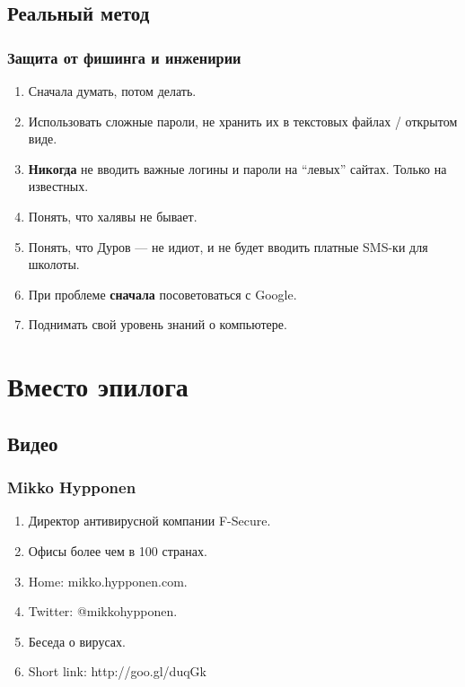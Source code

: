 \documentclass[compress,red]{beamer}
\begin{document}
\subsection{Реальный метод}
\begin{frame}
  \frametitle{Защита от фишинга и инженирии}
  \begin{enumerate}[<+->]
    \item Сначала думать, потом делать.
    \item Использовать сложные пароли, не хранить их в текстовых файлах / открытом виде.
    \item \textbf{Никогда} не вводить важные логины и пароли на ``левых'' сайтах. Только на известных.
    \item Понять, что халявы не бывает.
    \item Понять, что Дуров --- не идиот, и не будет вводить платные SMS-ки для школоты.
    \item При проблеме \textbf{сначала} посоветоваться с Google.
    \item Поднимать свой уровень знаний о компьютере.
  \end{enumerate}
\end{frame}

\section{Вместо эпилога}
\subsection{Видео}
\begin{frame}
  \frametitle{Mikko Hypponen}
  \begin{enumerate}[<+->]
    \item Директор антивирусной компании F-Secure.
    \item Офисы более чем в 100 странах.
    \item Home: mikko.hypponen.com.
    \item Twitter: @mikkohypponen.
    \item Беседа о вирусах.
    \item Short link: http://goo.gl/duqGk
  \end{enumerate}
\end{frame}
\end{document}
